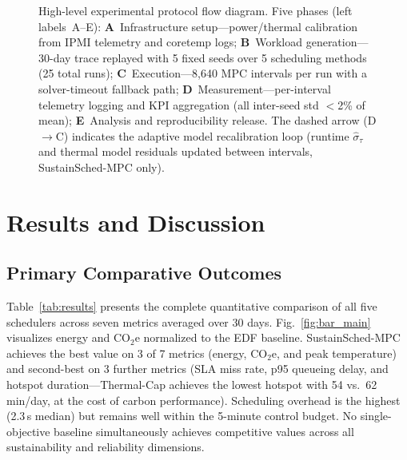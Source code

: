 \documentclass[a4paper,fleqn]{cas-dc}
\begin{document}
\begin{figure}[!t]
{%
}%
\caption{High-level experimental protocol flow diagram. Five phases (left labels~A--E): \textbf{A}~Infrastructure setup---power/thermal calibration from IPMI telemetry and coretemp logs; \textbf{B}~Workload generation---30-day trace replayed with 5 fixed seeds over 5 scheduling methods (25 total runs); \textbf{C}~Execution---8,640 MPC intervals per run with a solver-timeout fallback path; \textbf{D}~Measurement---per-interval telemetry logging and KPI aggregation (all inter-seed std $<$2\% of mean); \textbf{E}~Analysis and reproducibility release. The dashed arrow (D$\to$C) indicates the adaptive model recalibration loop (runtime $\hat{\sigma}_\tau$ and thermal model residuals updated between intervals, SustainSched-MPC only).}
\label{fig:exp_protocol}
\end{figure}
\FloatBarrier
\section{Results and Discussion}
\label{sec:results}

\subsection{Primary Comparative Outcomes}
\label{sec:primary_results}

Table~\ref{tab:results} presents the complete quantitative comparison of all five schedulers across seven metrics averaged over 30 days. Fig.~\ref{fig:bar_main} visualizes energy and CO$_2$e normalized to the EDF baseline. SustainSched-MPC achieves the best value on 3 of 7 metrics (energy, CO$_2$e, and peak temperature) and second-best on 3 further metrics (SLA miss rate, p95 queueing delay, and hotspot duration---Thermal-Cap achieves the lowest hotspot with 54 vs.\ 62\,min/day, at the cost of carbon performance). Scheduling overhead is the highest (2.3\,s median) but remains well within the 5-minute control budget. No single-objective baseline simultaneously achieves competitive values across all sustainability and reliability dimensions.
\end{document}

